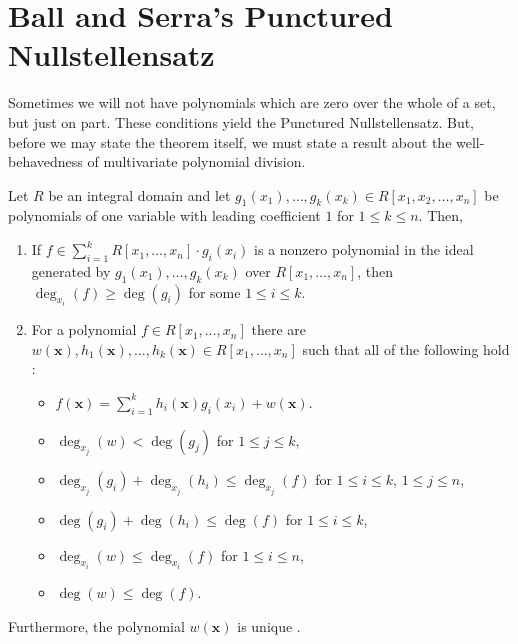 \section{Ball and Serra's Punctured Nullstellensatz}
Sometimes we will not have polynomials which are zero over the whole of a set, but just on part. These conditions yield the Punctured Nullstellensatz. But, before we may state the theorem itself, we must state a result about the well-behavedness of multivariate polynomial division.
\begin{lemma} Let $R$ be an integral domain
	and let $g_{1} \left( x_{1} \right), \ldots, g_{k} \left( x_{k} \right)
	\in R[x_1, x_2, \ldots, x_{n}] $ be polynomials of one variable with
	leading coefficient $1$ for $1 \le k \le n$. Then,
\begin{enumerate}
	\item If \(f \in \sum_{i= 1}^{k} R\left[ x_1, \ldots, x_{n} \right] \cdot g_{i}\left( x_{i} \right)  \) is a nonzero polynomial in the ideal generated by \(g_1 \left( x_1 \right) , \ldots, g_{k} \left( x_{k} \right) \) over \(R\left[ x_1, \ldots, x_{n} \right] \), then \(\deg _{x_{i}} \left(  f \right)\ge \deg \left( g_{i} \right)  \) for some \(1 \le i \le k\).
	\item For a polynomial \(f \in R\left[ x_1, \ldots, x_{n} \right] \) there are \\\(w\left( \textbf{x} \right) , h_1\left( \textbf{x} \right) , \ldots, h_{k}\left( \textbf{x} \right)  \in R \left[ x_1, \ldots, x_{n} \right] \) such that all of the following hold :
		\begin{itemize}
			\item \(f\left( \textbf{x}  \right) = \sum_{i= 1}^{k} h_{i}\left( \textbf{x} \right)  g_{i}\left( x_{i} \right) + w\left( \textbf{x} \right)  \).
				\item \(\deg _{x_{j}} \left(w \right) < \deg \left( g_{j} \right)  \) for \(1 \le j \le k\),
					\item \(\deg _{x_{j}} \left(g_{i} \right) + \deg _{x_{j}} \left(h_{i} \right) \le \deg _{x_{j}} \left(  f \right)   \) for \(1 \le i \le k\), \(1 \le j \le n\),
						\item \(\deg \left( g_{i} \right) + \deg \left( h_{i} \right) \le \deg \left( f \right)   \) for \(1 \le i \le k\),
							\item \(\deg _{x_{i}} \left(w \right) \le \deg _{x_{i}} \left(  f \right)  \) for \(1 \le i \le n\),
								\item \(\deg \left( w \right)  \le \deg \left( f \right) \).
		\end{itemize}
\end{enumerate}
Furthermore, the polynomial $w\left( \textbf{x} \right) $ is unique
.\end{lemma}

